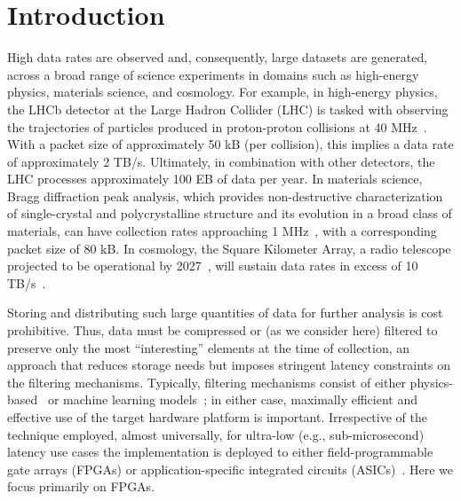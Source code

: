 \documentclass[10pt]{sig-alternate}
\begin{document}
\section{Introduction}\label{sec:Introduction}
High data rates are observed and, consequently, large datasets
are generated, across a broad range of science experiments in domains
such as high-energy physics, materials science, and cosmology. For
example, in high-energy physics, the LHCb detector at the Large
Hadron Collider (LHC) is tasked with observing the trajectories of particles
produced in proton-proton collisions at 40 MHz~\cite{pmlr-v42-glig14}. With a packet size of approximately
50 kB (per collision), this implies a data rate of approximately 2
TB/s. Ultimately, in combination with other detectors, the LHC processes
approximately 100 EB of data per year. In materials science, Bragg diffraction peak analysis, which provides non-destructive
characterization of single-crystal and polycrystalline structure and its evolution in a broad class of materials, can have collection
rates approaching 1 MHz~\cite{Hammer_2021}, with a corresponding
packet size of 80 kB. In cosmology, the Square Kilometer Array, a
radio telescope projected to be %
operational by 2027~\cite{mcmullin2022square}, will sustain data rates in excess
of 10 TB/s~\cite{grainge2017square}.

Storing and distributing
such large quantities of data
for further analysis is cost prohibitive.
Thus, data must be compressed or (as we consider here) filtered to preserve only the most ``interesting'' elements at the time of collection,
an approach that reduces storage needs but imposes
stringent latency constraints on the
filtering mechanisms. Typically, filtering mechanisms consist
of either physics-based~\cite{LHCB-FIGURE-2020-018} or machine
learning models~\cite{Gligorov_2013}; in either case, maximally efficient
and effective use of the target hardware platform is important.
Irrespective
of the technique employed, almost universally, for ultra-low (e.g., sub-microsecond)
latency use cases the
implementation is deployed to either field-programmable gate arrays
(FPGAs) or application-specific integrated circuits (ASICs)~\cite{Duarte_2018}.
Here we focus primarily on FPGAs.
\end{document}
